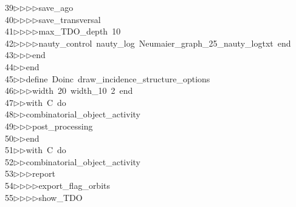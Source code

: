 \begin{tabbing}
39\>$\triangleright$\>$\triangleright$\>$\triangleright$\>$\triangleright$\>save\_ago\ \\[0pt]
40\>$\triangleright$\>$\triangleright$\>$\triangleright$\>$\triangleright$\>save\_transversal\ \\[0pt]
41\>$\triangleright$\>$\triangleright$\>$\triangleright$\>$\triangleright$\>max\_TDO\_depth\ 10\ \\[0pt]
42\>$\triangleright$\>$\triangleright$\>$\triangleright$\>$\triangleright$\>nauty\_control\ nauty\_log\ Neumaier\_graph\_25\_nauty\_logtxt\ end\ \\[0pt]
43\>$\triangleright$\>$\triangleright$\>$\triangleright$\>end\ \\[0pt]
44\>$\triangleright$\>$\triangleright$\>end\ \\[0pt]
45\>$\triangleright$\>$\triangleright$\>define\ Doinc\ draw\_incidence\_structure\_options\ \\[0pt]
46\>$\triangleright$\>$\triangleright$\>$\triangleright$\>width\ 20\ width\_10\ 2\ end\ \\[0pt]
47\>$\triangleright$\>$\triangleright$\>with\ C\ do\ \\[0pt]
48\>$\triangleright$\>$\triangleright$\>combinatorial\_object\_activity\ \\[0pt]
49\>$\triangleright$\>$\triangleright$\>$\triangleright$\>post\_processing\ \\[0pt]
50\>$\triangleright$\>$\triangleright$\>end\ \\[0pt]
51\>$\triangleright$\>$\triangleright$\>with\ C\ do\ \\[0pt]
52\>$\triangleright$\>$\triangleright$\>combinatorial\_object\_activity\ \\[0pt]
53\>$\triangleright$\>$\triangleright$\>$\triangleright$\>report\ \\[0pt]
54\>$\triangleright$\>$\triangleright$\>$\triangleright$\>$\triangleright$\>export\_flag\_orbits\ \\[0pt]
55\>$\triangleright$\>$\triangleright$\>$\triangleright$\>$\triangleright$\>show\_TDO\ \\[0pt]

\end{tabbing}
